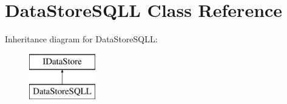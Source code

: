 \hypertarget{class_data_store_s_q_l_l}{}\section{Data\+Store\+S\+Q\+LL Class Reference}
\label{class_data_store_s_q_l_l}
Inheritance diagram for Data\+Store\+S\+Q\+LL\+:\begin{figure}[H]
\begin{center}
\leavevmode
\includegraphics[height=2.000000cm]{class_data_store_s_q_l_l}
\end{center}
\end{figure}
